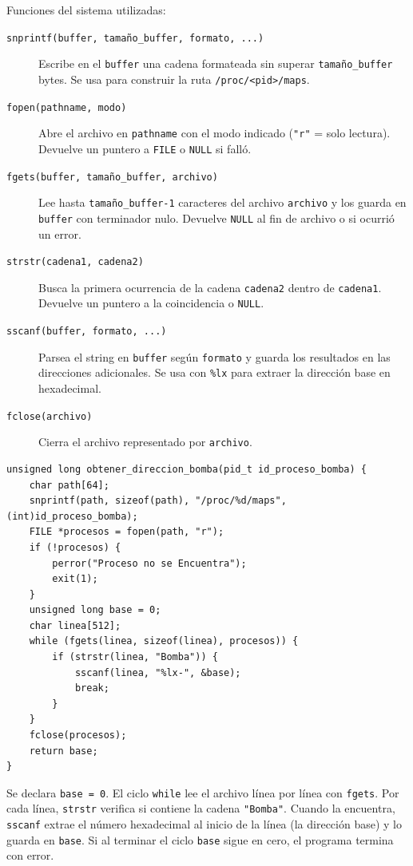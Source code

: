 \documentclass[10pt,a4paper]{article}
\begin{document}
Funciones del sistema utilizadas:
\begin{description}
    \item[\texttt{snprintf(buffer, tamaño\_buffer, formato, ...)}] Escribe en el \texttt{buffer} una cadena formateada sin superar \texttt{tamaño\_buffer} bytes. Se usa para construir la ruta \texttt{/proc/<pid>/maps}.
    \item[\texttt{fopen(pathname, modo)}] Abre el archivo en \texttt{pathname} con el modo indicado (\texttt{"r"} = solo lectura). Devuelve un puntero a \texttt{FILE} o \texttt{NULL} si falló.
    \item[\texttt{fgets(buffer, tamaño\_buffer, archivo)}] Lee hasta \texttt{tamaño\_buffer-1} caracteres del archivo \texttt{archivo} y los guarda en \texttt{buffer} con terminador nulo. Devuelve \texttt{NULL} al fin de archivo o si ocurrió un error.
    \item[\texttt{strstr(cadena1, cadena2)}] Busca la primera ocurrencia de la cadena \texttt{cadena2} dentro de \texttt{cadena1}. Devuelve un puntero a la coincidencia o \texttt{NULL}.
    \item[\texttt{sscanf(buffer, formato, ...)}] Parsea el string en \texttt{buffer} según \texttt{formato} y guarda los resultados en las direcciones adicionales. Se usa con \texttt{\%lx} para extraer la dirección base en hexadecimal.
    \item[\texttt{fclose(archivo)}] Cierra el archivo representado por \texttt{archivo}.
\end{description}

\begin{lstlisting}[style=cstyle, caption={Funcion obtener\_direccion\_bomba}]
unsigned long obtener_direccion_bomba(pid_t id_proceso_bomba) {
    char path[64];
    snprintf(path, sizeof(path), "/proc/%d/maps", (int)id_proceso_bomba);
    FILE *procesos = fopen(path, "r");
    if (!procesos) {
        perror("Proceso no se Encuentra");
        exit(1);
    }
    unsigned long base = 0;
    char linea[512];
    while (fgets(linea, sizeof(linea), procesos)) {
        if (strstr(linea, "Bomba")) {
            sscanf(linea, "%lx-", &base);
            break;
        }
    }
    fclose(procesos);
    return base;
}
\end{lstlisting}

Se declara \texttt{base = 0}. El ciclo \texttt{while} lee el archivo línea por línea con \texttt{fgets}. Por cada línea, \texttt{strstr} verifica si contiene la cadena \texttt{"Bomba"}. Cuando la encuentra, \texttt{sscanf} extrae el número hexadecimal al inicio de la línea (la dirección base) y lo guarda en \texttt{base}. Si al terminar el ciclo \texttt{base} sigue en cero, el programa termina con error.
\end{document}
